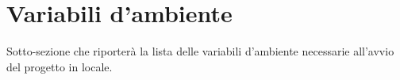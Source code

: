 \section{Variabili d'ambiente}

Sotto-sezione che riporterà la lista delle variabili d'ambiente necessarie all'avvio del progetto in locale.
